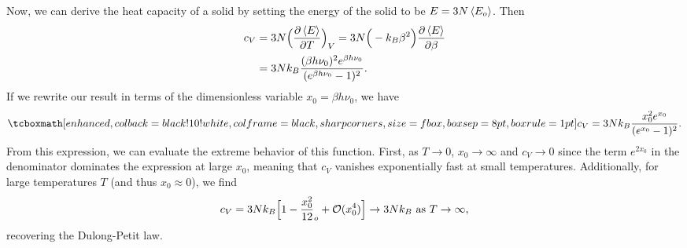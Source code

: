 {Now, we can derive the heat capacity of a solid by setting the energy of the solid to be $E = 3 N \expval{E_o}$.
Then
\begin{eqnarray}
    \begin{aligned}
        c_{V} &= 3N \Big( \pdv{\expval{E}}{T} \Big)_{V} = 3N \Big( -k_{B} \beta^2 \Big) \pdv{\expval{E}}{\beta} \\
              &= 3 N k_{B} \frac{(\beta h \nu_0)^2 e^{\beta h \nu_0}}{(e^{\beta h \nu_0} - 1)^2}
    .\end{aligned}
\end{eqnarray}
If we rewrite our result in terms of the dimensionless variable $x_0 = \beta h \nu_0$, we have
\begin{eqnarray}
    \eqbox{ c_{V} = 3 N k_{B} \frac{x_0^2 e^{x_0}}{(e^{x_0} - 1)^2} }
.\end{eqnarray}
From this expression, we can evaluate the extreme behavior of this function.
First, as $T \rightarrow 0$, $x_0 \rightarrow \infty$ and $c_{V} \rightarrow 0$ since the term $e^{2x_0}$ in the denominator dominates the expression at large $x_0$, meaning that $c_{V}$ vanishes exponentially fast at small temperatures.
Additionally, for large temperatures $T$ (and thus $x_0 \approx 0$), we find
\begin{eqnarray}
    c_{V} = 3Nk_{B} \Big[ 1 - \frac{x_0^2}{12}_o + {\cal O}(x_0^{4}) \Big] \rightarrow 3 N k_{B} ~{\rm as}~ T \rightarrow \infty
,\end{eqnarray}
recovering the Dulong-Petit law.

}
